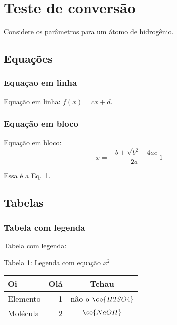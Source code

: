 \section{Teste de conversão}\label{teste-de-conversuxe3o}

Considere os parâmetros para um átomo de hidrogênio.

\subsection{Equações}\label{equauxe7uxf5es}

\subsubsection{Equação em linha}\label{equauxe7uxe3o-em-linha}

Equação em linha: \(f(x) = cx + d\).

\subsubsection{Equação em bloco}\label{equauxe7uxe3o-em-bloco}

Equação em bloco: \protect\hypertarget{eq:eq1}{}{\[
    x = \dfrac{ -b \pm \sqrt{b^2 - 4 ac} }{ 2a }
{1}\]}

Essa é a \hyperref[eq:eq1]{Eq.~1}.

\subsection{Tabelas}\label{tabelas}

\subsubsection{Tabela com legenda}\label{tabela-com-legenda}

Tabela com legenda:

\hypertarget{tbl:tbl1}{}
\begin{displaytable}{{Tabela 1:} Legenda com equação \(x^2\)}

\begin{tabular}{lrc}

\textbf{Oi} & \textbf{Olá} & \textbf{Tchau}

\\ \midrule

{Elemento} & {1} & {não o \(\ce{H2SO4}\)}\\
{Molécula} & {2} & {\(\ce{NaOH}\)}

\end{tabular}

\end{displaytable}
